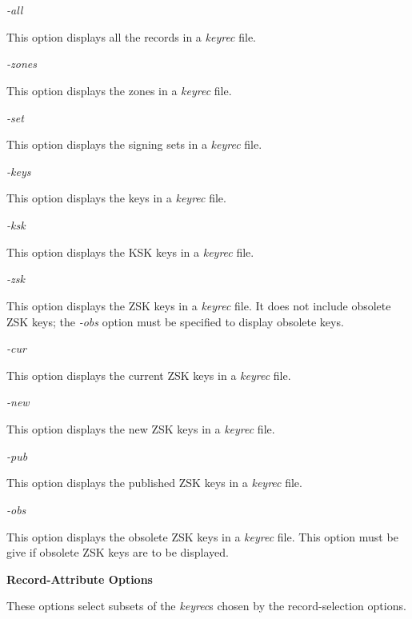 \begin{description}

\item {\it -all}\verb" "

This option displays all the records in a {\it keyrec} file.

\item {\it -zones}\verb" "

This option displays the zones in a {\it keyrec} file.

\item {\it -set}\verb" "

This option displays the signing sets in a {\it keyrec} file.

\item {\it -keys}\verb" "

This option displays the keys in a {\it keyrec} file.

\item {\it -ksk}\verb" "

This option displays the KSK keys in a {\it keyrec} file.

\item {\it -zsk}\verb" "

This option displays the ZSK keys in a {\it keyrec} file.  It does not include
obsolete ZSK keys; the {\it -obs} option must be specified to display obsolete
keys.

\item {\it -cur}\verb" "

This option displays the current ZSK keys in a {\it keyrec} file.

\item {\it -new}\verb" "

This option displays the new ZSK keys in a {\it keyrec} file.

\item {\it -pub}\verb" "

This option displays the published ZSK keys in a {\it keyrec} file.

\item {\it -obs}\verb" "

This option displays the obsolete ZSK keys in a {\it keyrec} file.
This option must be give if obsolete ZSK keys are to be displayed.

\end{description}

{\bf Record-Attribute Options}

These options select subsets of the {\it keyrec}s chosen by the
record-selection options. 

